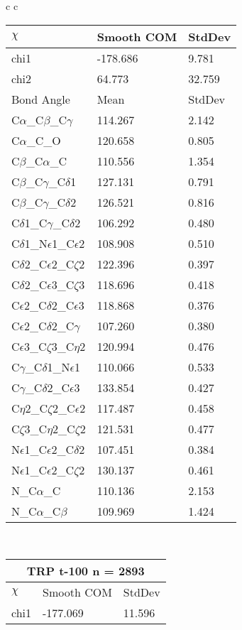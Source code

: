 \begin{longtable}{ c c }
\begin{tabular}{ l l l }
  $\chi$       & Smooth COM & StdDev \\ \midrule
  chi1 & -178.686 & 9.781 \\ 
  chi2 & 64.773 & 32.759 \\ \midrule
  Bond Angle   & Mean     & StdDev \\ \midrule
  C$\alpha$\_C$\beta$\_C$\gamma$ & 114.267 & 2.142\\
  C$\alpha$\_C\_O & 120.658 & 0.805\\
  C$\beta$\_C$\alpha$\_C & 110.556 & 1.354\\
  C$\beta$\_C$\gamma$\_C$\delta$1 & 127.131 & 0.791\\
  C$\beta$\_C$\gamma$\_C$\delta$2 & 126.521 & 0.816\\
  C$\delta$1\_C$\gamma$\_C$\delta$2 & 106.292 & 0.480\\
  C$\delta$1\_N$\epsilon$1\_C$\epsilon$2 & 108.908 & 0.510\\
  C$\delta$2\_C$\epsilon$2\_C$\zeta$2 & 122.396 & 0.397\\
  C$\delta$2\_C$\epsilon$3\_C$\zeta$3 & 118.696 & 0.418\\
  C$\epsilon$2\_C$\delta$2\_C$\epsilon$3 & 118.868 & 0.376\\
  C$\epsilon$2\_C$\delta$2\_C$\gamma$ & 107.260 & 0.380\\
  C$\epsilon$3\_C$\zeta$3\_C$\eta$2 & 120.994 & 0.476\\
  C$\gamma$\_C$\delta$1\_N$\epsilon$1 & 110.066 & 0.533\\
  C$\gamma$\_C$\delta$2\_C$\epsilon$3 & 133.854 & 0.427\\
  C$\eta$2\_C$\zeta$2\_C$\epsilon$2 & 117.487 & 0.458\\
  C$\zeta$3\_C$\eta$2\_C$\zeta$2 & 121.531 & 0.477\\
  N$\epsilon$1\_C$\epsilon$2\_C$\delta$2 & 107.451 & 0.384\\
  N$\epsilon$1\_C$\epsilon$2\_C$\zeta$2 & 130.137 & 0.461\\
  N\_C$\alpha$\_C & 110.136 & 2.153\\
  N\_C$\alpha$\_C$\beta$ & 109.969 & 1.424\\
  \bottomrule
  \end{tabular}
  \\
  \begin{tabular}{ l l l }
  \toprule
  \multicolumn{3}{c}{TRP \textbf{t-100} n = 2893} \\ \toprule
  $\chi$       & Smooth COM & StdDev \\ \midrule
  chi1 & -177.069 & 11.596 \\ 

\end{tabular}
\end{longtable}
